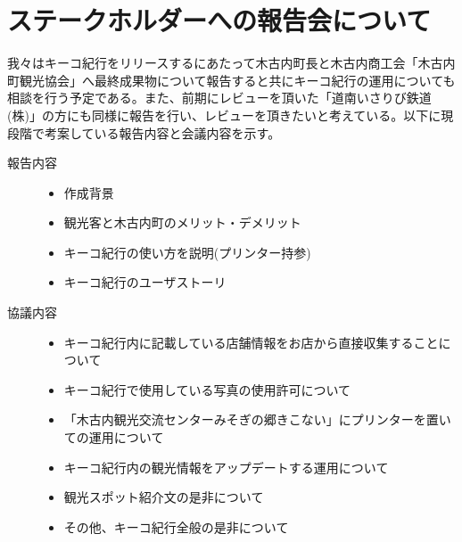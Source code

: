 \section{ステークホルダーへの報告会について}
我々はキーコ紀行をリリースするにあたって木古内町長と木古内商工会「木古内町観光協会」へ最終成果物について報告すると共にキーコ紀行の運用についても相談を行う予定である。また、前期にレビューを頂いた「道南いさりび鉄道(株)」の方にも同様に報告を行い、レビューを頂きたいと考えている。以下に現段階で考案している報告内容と会議内容を示す。
\begin{description}
 \item[報告内容]\mbox{}
 	\begin{itemize}
	\item 作成背景
	\item 観光客と木古内町のメリット・デメリット
	\item キーコ紀行の使い方を説明(プリンター持参)
	\item キーコ紀行のユーザストーリ \\
	\end{itemize}
 \item[協議内容]\mbox{}
	\begin{itemize}
	\item キーコ紀行内に記載している店舗情報をお店から直接収集することについて
	\item キーコ紀行で使用している写真の使用許可について
	\item 「木古内観光交流センターみそぎの郷きこない」にプリンターを置いての運用について
	\item キーコ紀行内の観光情報をアップデートする運用について
	\item 観光スポット紹介文の是非について
	\item その他、キーコ紀行全般の是非について
	\end{itemize}
\end{description}

